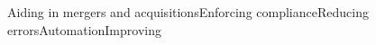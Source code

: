 \documentclass[preview]{standalone}
\begin{document}
\begin{center}
Aiding in mergers and acquisitionsEnforcing complianceReducing errorsAutomationImproving
\end{center}
\end{document}
